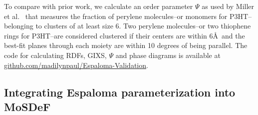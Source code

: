 To compare with prior work, we calculate an order parameter $\Psi$ as used by Miller et al.~ \cite{miller_optimization_2018}that measures the fraction of perylene molecules--or monomers for P3HT--belonging to clusters of at least size 6.
Two perylene molecules--or two thiophene rings for P3HT--are considered clustered if their centers are within 6\AA~and the best-fit planes through each moiety are within 10 degrees of being parallel.
The code for calculating RDFs, GIXS, $\Psi$ and phase diagrams is available at \url{github.com/madilynpaul/Espaloma-Validation}. 

\subsection{Integrating Espaloma parameterization into MoSDeF} 

